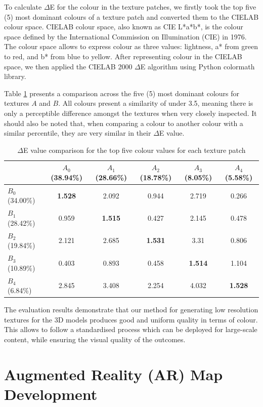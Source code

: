 \documentclass[acmlarge,screen,dvipsnames]{acmart}
\begin{document}
To calculate $\Delta$E for the colour in the texture patches, we firstly took 
the top five (5) most dominant colours of a texture
patch and converted them to the CIELAB colour space. CIELAB colour space,
also known as CIE L*a*b*, is the colour space defined by the International Commission on Illumination (CIE) in 1976. The colour space allows to express colour as
three values: lightness, a* from green to red, and b* from blue to yellow. After 
representing colour in the CIELAB space, we then applied the 
CIELAB 2000 $\Delta$E algorithm using Python colormath library. 

Table \ref{tab:delta} presents a comparison across the five (5) most dominant colours for textures $ A $ and $ B $. 
All colours present a similarity of under 3.5, meaning there is only a perceptible difference amongst the textures when very closely inspected. It should also be noted that, when comparing a colour to another colour with a similar percentile, they are very similar in their $\Delta$E value. 

\begin{table}[h]
\begin{tabular}{ | l | c | c | c | c | c |}
\toprule
  & $ A_0 $ (38.94\%)  & $ A_1 $ (28.66\%) & $ A_2 $ (18.78\%)& $ A_3 $ (8.05\%) & $ A_4 $ (5.58\%)  \\ 
\midrule
 $ B_0 $ (34.00\%) & \textbf{1.528} & 2.092 & 0.944 & 2.719 & 0.266  \\ 
 $ B_1 $ (28.42\%)& 0.959 & \textbf{1.515} & 0.427 & 2.145 & 0.478  \\ 
 $ B_2 $ (19.84\%)& 2.121 & 2.685 & \textbf{1.531} & 3.31 &  0.806 \\ 
 $ B_3 $ (10.89\%) & 0.403 & 0.893 & 0.458 & \textbf{1.514} & 1.104  \\ 
 $ B_4 $ (6.84\%) & 2.845 & 3.408 & 2.254 & 4.032 & \textbf{1.528}  \\ 
\bottomrule
\end{tabular}
\caption{$\Delta$E value comparison for the top five colour values for each texture patch}
\label{tab:delta} 
\end{table}

The evaluation results demonstrate that our method for generating 
low resolution textures for the 3D models produces good and uniform quality 
in terms of colour. This allows to
follow a standardised process which can be deployed for large-scale
content, while ensuring the visual quality of the outcomes.


\section{Augmented Reality (AR) Map Development} \label{tech} 
\end{document}
